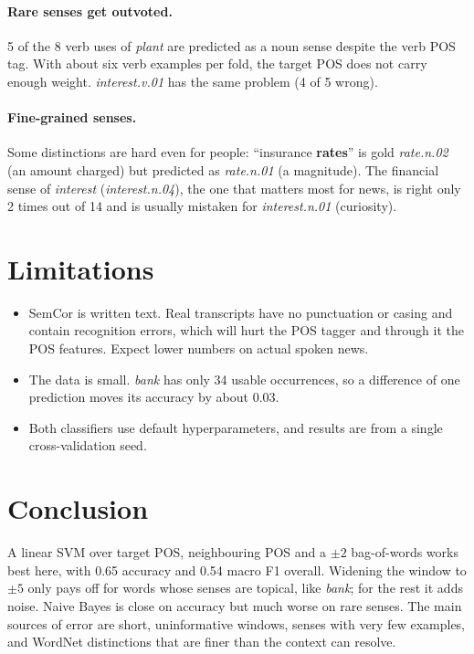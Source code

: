 \documentclass[11pt]{article}
\begin{document}
\paragraph{Rare senses get outvoted.} 5 of the 8 verb uses of \emph{plant} are
predicted as a noun sense despite the verb POS tag. With about six verb examples
per fold, the target POS does not carry enough weight. \emph{interest.v.01} has
the same problem (4 of 5 wrong).

\paragraph{Fine-grained senses.} Some distinctions are hard even for people:
``insurance \textbf{rates}'' is gold \emph{rate.n.02} (an amount charged) but
predicted as \emph{rate.n.01} (a magnitude). The financial sense of
\emph{interest} (\emph{interest.n.04}), the one that matters most for news, is
right only 2 times out of 14 and is usually mistaken for \emph{interest.n.01}
(curiosity).

\section{Limitations}

\begin{itemize}
\item SemCor is written text. Real transcripts have no punctuation or casing and
contain recognition errors, which will hurt the POS tagger and through it the
POS features. Expect lower numbers on actual spoken news.
\item The data is small. \emph{bank} has only 34 usable occurrences, so a
difference of one prediction moves its accuracy by about 0.03.
\item Both classifiers use default hyperparameters, and results are from a
single cross-validation seed.
\end{itemize}

\section{Conclusion}

A linear SVM over target POS, neighbouring POS and a $\pm 2$ bag-of-words works
best here, with 0.65 accuracy and 0.54 macro F1 overall. Widening the window to
$\pm 5$ only pays off for words whose senses are topical, like \emph{bank}; for
the rest it adds noise. Naive Bayes is close on accuracy but much worse on
rare senses. The main sources of error are short, uninformative windows,
senses with very few examples, and WordNet distinctions that are finer than the
context can resolve.
\end{document}
